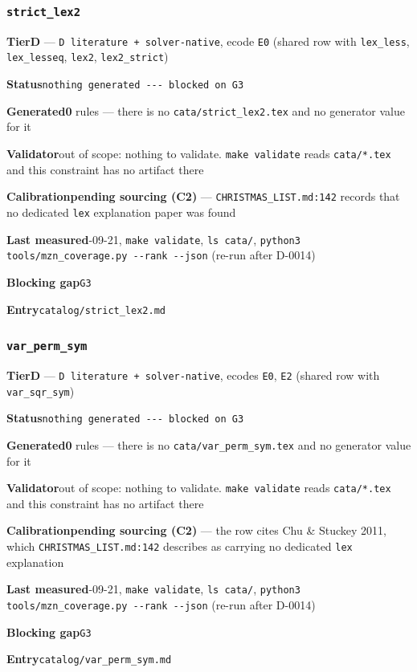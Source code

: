 \documentclass[10pt,a4paper]{article}
\newcommand{\entryfield}[2]{{\raggedright\textbf{#1}\quad #2\par}}
\begin{document}
\subsubsection*{\texttt{strict\_\allowbreak{}lex2}}
\label{entry:strict-lex2}
\entryfield{Tier}{\textbf{D} --- \texttt{D literature + solver-\allowbreak{}native}, ecode \texttt{E0} (shared row with \texttt{lex\_less}, \texttt{lex\_lesseq}, \texttt{lex2}, \texttt{lex2\_strict})}
\entryfield{Status}{\texttt{nothing generated -\allowbreak{}-\allowbreak{}-\allowbreak{} blocked on G3}}
\entryfield{Generated}{\textbf{0} rules --- there is no \texttt{cata/strict\_lex2.tex} and no generator value for it}
\entryfield{Validator}{out of scope: nothing to validate. \texttt{make validate} reads \texttt{cata/*.tex} and this constraint has no artifact there}
\entryfield{Calibration}{\textbf{pending sourcing (C2)} --- \texttt{CHRISTMAS\_LIST.md:142} records that no dedicated \texttt{lex} explanation paper was found}
\entryfield{Last measured}{2026-09-21, \texttt{make validate}, \texttt{ls cata/}, \texttt{python3 tools/\allowbreak{}mzn\_\allowbreak{}coverage.\allowbreak{}py -\allowbreak{}-\allowbreak{}rank -\allowbreak{}-\allowbreak{}json} (re-run after D-0014)}
\entryfield{Blocking gap}{\texttt{G3}}
\entryfield{Entry}{\texttt{catalog/strict\_lex2.md}}
\subsubsection*{\texttt{var\_\allowbreak{}perm\_\allowbreak{}sym}}
\label{entry:var-perm-sym}
\entryfield{Tier}{\textbf{D} --- \texttt{D literature + solver-\allowbreak{}native}, ecodes \texttt{E0}, \texttt{E2} (shared row with \texttt{var\_sqr\_sym})}
\entryfield{Status}{\texttt{nothing generated -\allowbreak{}-\allowbreak{}-\allowbreak{} blocked on G3}}
\entryfield{Generated}{\textbf{0} rules --- there is no \texttt{cata/var\_perm\_sym.tex} and no generator value for it}
\entryfield{Validator}{out of scope: nothing to validate. \texttt{make validate} reads \texttt{cata/*.tex} and this constraint has no artifact there}
\entryfield{Calibration}{\textbf{pending sourcing (C2)} --- the row cites Chu \& Stuckey 2011, which \texttt{CHRISTMAS\_LIST.md:142} describes as carrying no dedicated \texttt{lex} explanation}
\entryfield{Last measured}{2026-09-21, \texttt{make validate}, \texttt{ls cata/}, \texttt{python3 tools/\allowbreak{}mzn\_\allowbreak{}coverage.\allowbreak{}py -\allowbreak{}-\allowbreak{}rank -\allowbreak{}-\allowbreak{}json} (re-run after D-0014)}
\entryfield{Blocking gap}{\texttt{G3}}
\entryfield{Entry}{\texttt{catalog/var\_perm\_sym.md}}
\end{document}
